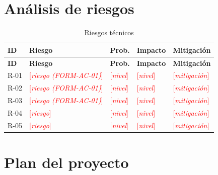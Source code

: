 \documentclass[11pt,a4paper]{article}
\newcommand{\pendiente}[1]{\textcolor{red}{[\textit{#1}]}}
\begin{document}
\section{Análisis de riesgos}
\begin{xltabular}{\textwidth}{lXllL{3.5cm}}
  \caption{Riesgos técnicos}\label{tab:riesgos}\\
  \toprule
  \textbf{ID} & \textbf{Riesgo} & \textbf{Prob.} & \textbf{Impacto} & \textbf{Mitigación} \\
  \midrule
  \endfirsthead
  \toprule
  \textbf{ID} & \textbf{Riesgo} & \textbf{Prob.} & \textbf{Impacto} & \textbf{Mitigación} \\
  \midrule
  \endhead
  \bottomrule
  \endfoot
  R-01 & \pendiente{riesgo (FORM-AC-01)} & \pendiente{nivel} & \pendiente{nivel} & \pendiente{mitigación} \\
  R-02 & \pendiente{riesgo (FORM-AC-01)} & \pendiente{nivel} & \pendiente{nivel} & \pendiente{mitigación} \\
  R-03 & \pendiente{riesgo (FORM-AC-01)} & \pendiente{nivel} & \pendiente{nivel} & \pendiente{mitigación} \\
  R-04 & \pendiente{riesgo} & \pendiente{nivel} & \pendiente{nivel} & \pendiente{mitigación} \\
  R-05 & \pendiente{riesgo} & \pendiente{nivel} & \pendiente{nivel} & \pendiente{mitigación} \\
\end{xltabular}

\section{Plan del proyecto}
\end{document}

